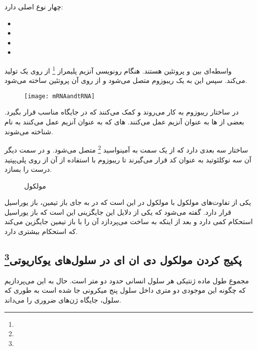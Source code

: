 چهار نوع اصلی دارد:
\begin{itemize}
\item {}
\item {}
\item {}
\item {}
\end{itemize}

واسطه‌ای بین
و پروتئین هستند. هنگام رونویسی آنزیم
پلیمراز
\footnote{}
از روی
یک
تولید می‌کند. سپس این
به یک ریبوزوم متصل می‌شود و از روی آن پروتئین ساخته می‌شود. 

\begin{figure}[htbp]
	\texttt{[image: mRNAandtRNA]}
\end{figure}

\pagebreak
{}
در ساختار ریبوزوم به کار می‌روند و کمک می‌کنند که
در جایگاه مناسب قرار بگیرد.
بعضی از
ها به عنوان آنزیم عمل می‌کنند.
های که به عنوان آنزیم عمل می‌کنند به نام
شناخته می‌شوند.

ساختار سه بعدی دارد که از یک سمت به آمینواسید
\footnote{}
متصل می‌شود. و در سمت دیگر آن سه نوکلئوتید به عنوان کد قرار می‌گیرند تا ریبوزوم با استفاده از آن از روی
پلی‌پپتید درست را بسازد.

\begin{figure}[htbp]
	\qquad
		\caption{مولکول
		}
\end{figure}

یکی از تفاوت‌های مولکول
با مولکول
در این است که در
به جای باز تیمین، باز یوراسیل قرار دارد. گفته می‌شود که یکی از دلایل این جایگزینی این است که باز یوراسیل استحکام کمی دارد و بعد از اینکه
به ساخت
می‌پردازد
آن را با باز تیمین جایگزین می‌کند که استحکام بیشتری دارد.
\cite{MolecularStructureOfRna}

\pagebreak
\subsection{پکیج کردن مولکول دی ان ای در سلول‌های یوکاریوتی\protect\footnote{}}

مجموع طول ماده ژنتیکی هر سلول انسانی حدود دو متر است. حال به این می‌پردازیم که چگونه این موجودی دو متری داخل سلول پنج میکرونی جا شده است به طوری که سلول، جایگاه ژن‌های ضروری را می‌داند.

